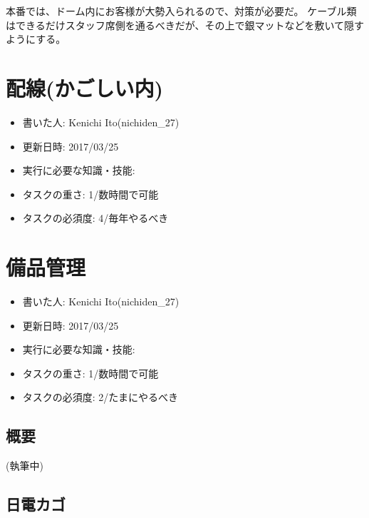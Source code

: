 \documentclass[letterpaper,10pt,dvipdfmx]{sphinxmanual}
\begin{document}
本番では、ドーム内にお客様が大勢入られるので、対策が必要だ。
ケーブル類はできるだけスタッフ席側を通るべきだが、その上で銀マットなどを敷いて隠すようにする。


\chapter{配線(かごしい内)}
\label{\detokenize{haisen-kagoshii::doc}}\label{\detokenize{haisen-kagoshii:id1}}\begin{itemize}
\item {} 
書いた人: Kenichi Ito(nichiden\_27)

\item {} 
更新日時: 2017/03/25

\item {} 
実行に必要な知識・技能:

\item {} 
タスクの重さ: 1/数時間で可能

\item {} 
タスクの必須度: 4/毎年やるべき

\end{itemize}


\chapter{備品管理}
\label{\detokenize{bihin::doc}}\label{\detokenize{bihin:id1}}\begin{itemize}
\item {} 
書いた人: Kenichi Ito(nichiden\_27)

\item {} 
更新日時: 2017/03/25

\item {} 
実行に必要な知識・技能:

\item {} 
タスクの重さ: 1/数時間で可能

\item {} 
タスクの必須度: 2/たまにやるべき

\end{itemize}


\section{概要}
\label{\detokenize{bihin:id2}}
(執筆中)


\section{日電カゴ}
\label{\detokenize{bihin:id3}}
\end{document}

